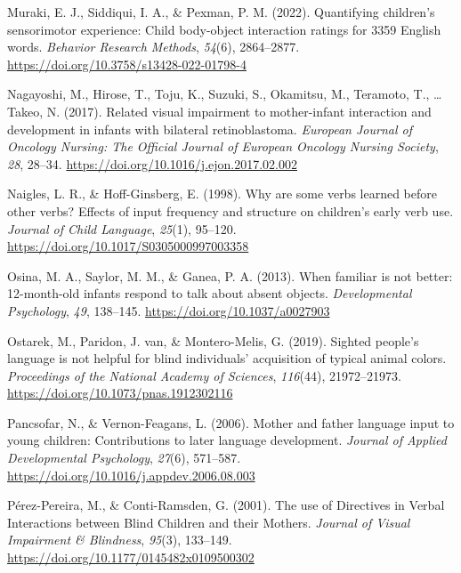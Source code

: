 \documentclass[
  man,floatsintext]{apa6}
\newlength{\cslhangindent}
\newlength{\cslentryspacingunit} %
\newenvironment{CSLReferences}[2] %
 {%
  \setlength{\parindent}{0pt}
  \ifodd #1
  \let\oldpar\par
  \def\par{\hangindent=\cslhangindent\oldpar}
  \fi
  \setlength{\parskip}{#2\cslentryspacingunit}
 }%
 {}
\begin{document}
\begin{CSLReferences}{1}{0}
\leavevmode{}%
Muraki, E. J., Siddiqui, I. A., \& Pexman, P. M. (2022). Quantifying children's sensorimotor experience: {Child} body-object interaction ratings for 3359 {English} words. \emph{Behavior Research Methods}, \emph{54}(6), 2864--2877. \url{https://doi.org/10.3758/s13428-022-01798-4}

\leavevmode{}%
Nagayoshi, M., Hirose, T., Toju, K., Suzuki, S., Okamitsu, M., Teramoto, T., \ldots{} Takeo, N. (2017). Related visual impairment to mother-infant interaction and development in infants with bilateral retinoblastoma. \emph{European Journal of Oncology Nursing: The Official Journal of European Oncology Nursing Society}, \emph{28}, 28--34. \url{https://doi.org/10.1016/j.ejon.2017.02.002}

\leavevmode{}%
Naigles, L. R., \& Hoff-Ginsberg, E. (1998). Why are some verbs learned before other verbs? {Effects} of input frequency and structure on children's early verb use. \emph{Journal of Child Language}, \emph{25}(1), 95--120. \url{https://doi.org/10.1017/S0305000997003358}

\leavevmode{}%
Osina, M. A., Saylor, M. M., \& Ganea, P. A. (2013). When familiar is not better: 12-month-old infants respond to talk about absent objects. \emph{Developmental Psychology}, \emph{49}, 138--145. \url{https://doi.org/10.1037/a0027903}

\leavevmode{}%
Ostarek, M., Paridon, J. van, \& Montero-Melis, G. (2019). Sighted people's language is not helpful for blind individuals' acquisition of typical animal colors. \emph{Proceedings of the National Academy of Sciences}, \emph{116}(44), 21972--21973. \url{https://doi.org/10.1073/pnas.1912302116}

\leavevmode{}%
Pancsofar, N., \& Vernon-Feagans, L. (2006). Mother and father language input to young children: {Contributions} to later language development. \emph{Journal of Applied Developmental Psychology}, \emph{27}(6), 571--587. \url{https://doi.org/10.1016/j.appdev.2006.08.003}

\leavevmode{}%
Pérez-Pereira, M., \& Conti-Ramsden, G. (2001). The use of {Directives} in {Verbal Interactions} between {Blind Children} and their {Mothers}. \emph{Journal of Visual Impairment \& Blindness}, \emph{95}(3), 133--149. \url{https://doi.org/10.1177/0145482x0109500302}


\end{CSLReferences}
\end{document}
